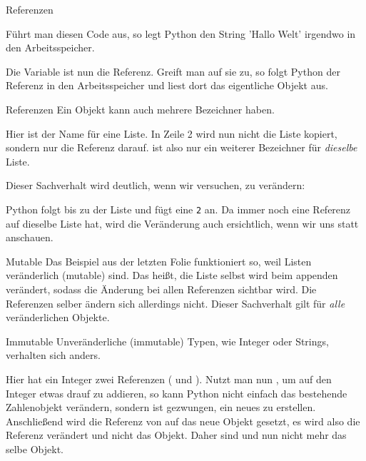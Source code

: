 \begin{frame}{Referenzen}
	
	Führt man diesen Code aus, so legt Python den String 'Hallo Welt' irgendwo in den Arbeitsspeicher. 
	
	Die Variable  ist nun die Referenz. Greift man auf sie zu, so folgt Python der Referenz in den Arbeitsspeicher und liest dort das eigentliche Objekt aus.
\end{frame}

\begin{frame}{Referenzen}
	Ein Objekt kann auch mehrere Bezeichner haben.
	
	Hier ist  der Name für eine Liste. In Zeile 2 wird nun nicht die Liste kopiert, sondern nur die Referenz darauf.  ist also nur ein weiterer Bezeichner für \textit{dieselbe} Liste.
	
	Dieser Sachverhalt wird deutlich, wenn wir versuchen,  zu verändern:
	
	Python folgt  bis zu der Liste und fügt eine \texttt{2} an. Da  immer noch eine Referenz auf dieselbe Liste hat, wird die Veränderung auch ersichtlich, wenn wir uns  statt  anschauen.
\end{frame}

\begin{frame}{Mutable}
	Das Beispiel aus der letzten Folie funktioniert so, weil Listen veränderlich (mutable) sind. Das heißt, die Liste selbst wird beim appenden verändert, sodass die Änderung bei allen Referenzen sichtbar wird. \alert{Die Referenzen selber ändern sich allerdings nicht.} Dieser Sachverhalt gilt für \textit{alle} veränderlichen Objekte.
\end{frame}

\begin{frame}{Immutable}
	Unveränderliche (immutable) Typen, wie Integer oder Strings, verhalten sich anders.
	
	Hier hat ein Integer zwei Referenzen ( und ). Nutzt man nun , um auf den Integer etwas drauf zu addieren, so kann Python nicht einfach das bestehende Zahlenobjekt verändern, sondern ist gezwungen, ein neues zu erstellen. Anschließend wird die Referenz von  auf das neue Objekt gesetzt, es wird also die Referenz verändert und nicht das Objekt. Daher sind  und  nun nicht mehr das selbe Objekt.
\end{frame}

